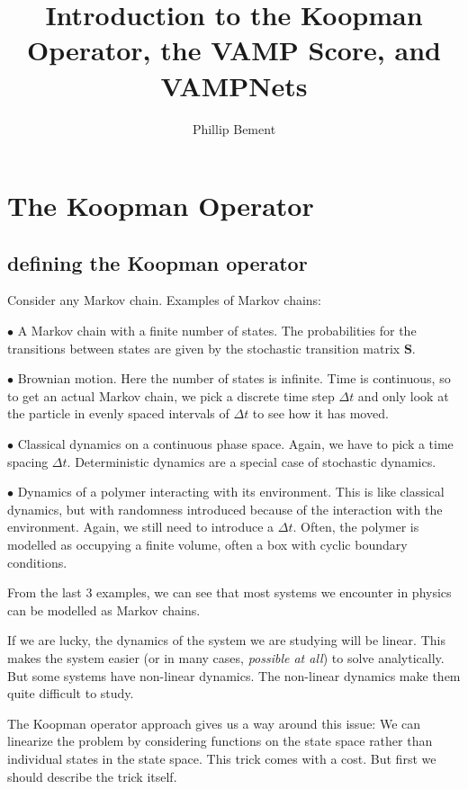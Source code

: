 \documentclass[]{article}
\title{Introduction to the Koopman Operator, the VAMP Score, and VAMPNets}
\author{Phillip Bement}
\newcommand{\w}[1]{\mathbf{#1}}
\begin{document}
\maketitle

\section{The Koopman Operator}

\subsection{defining the Koopman operator}

Consider any Markov chain. Examples of Markov chains:

$\bullet$ A Markov chain with a finite number of states. The probabilities for the transitions between states are given by the stochastic transition matrix $\w{S}$.

$\bullet$ Brownian motion. Here the number of states is infinite. Time is continuous, so to get an actual Markov chain, we pick a discrete time step $\Delta t$ and only look at the particle in evenly spaced intervals of $\Delta t$ to see how it has moved.

$\bullet$ Classical dynamics on a continuous phase space. Again, we have to pick a time spacing $\Delta t$. Deterministic dynamics are a special case of stochastic dynamics.

$\bullet$ Dynamics of a polymer interacting with its environment. This is like classical dynamics, but with randomness introduced because of the interaction with the environment. Again, we still need to introduce a $\Delta t$. Often, the polymer is modelled as occupying a finite volume, often a box with cyclic boundary conditions.

From the last 3 examples, we can see that most systems we encounter in physics can be modelled as Markov chains.

If we are lucky, the dynamics of the system we are studying will be linear. This makes the system easier (or in many cases, {\em possible at all}) to solve analytically. But some systems have non-linear dynamics. The non-linear dynamics make them quite difficult to study.

The Koopman operator approach gives us a way around this issue: We can linearize the problem by considering functions on the state space rather than individual states in the state space. This trick comes with a cost. But first we should describe the trick itself.
\end{document}
